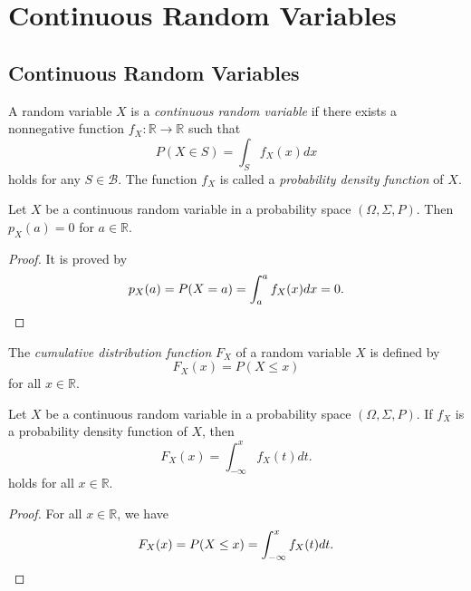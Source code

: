 \chapter{Continuous Random Variables}
\section{Continuous Random Variables}
\begin{definition}
  A random variable $X$ is a \emph{continuous random variable}
  if there exists a nonnegative function $f_X: \mathbb{R} \to \mathbb{R}$
  such that
  \begin{equation*}
    P(X \in S) = \int_S f_X(x) dx
  \end{equation*}
  holds for any $S \in \mathcal{B}$.
  The function $f_X$ is called a \emph{probability density function} of $X$.
\end{definition}

\begin{theorem}
  Let $X$ be a continuous random variable in a probability space
  $(\Omega, \Sigma, P)$.
  Then $p_X(a) = 0$ for $a \in \mathbb{R}$.
\end{theorem}
\begin{proof}
  It is proved by
  \begin{equation*}
    p_X(a) = P(X = a) = \int_a^a f_X(x)dx = 0. \qedhere
  \end{equation*}
\end{proof}

\begin{definition}
  The \emph{cumulative distribution function} $F_X$ of a random variable $X$
  is defined by
  \begin{equation*}
    F_X(x) = P(X \leq x)
  \end{equation*}
  for all $x \in \mathbb{R}$.
\end{definition}

\begin{theorem}
  Let $X$ be a continuous random variable in a probability space
  $(\Omega, \Sigma, P)$.
  If $f_X$ is a probability density function of $X$, then
  \begin{equation*}
    F_X(x) = \int_{-\infty}^x f_X(t) dt.
  \end{equation*}
  holds for all $x \in \mathbb{R}$.
\end{theorem}
\begin{proof}
  For all $x \in \mathbb{R}$, we have
  \begin{equation*}
    F_X(x) = P(X \leq x)
           = \int_{-\infty}^x f_X(t) dt. \qedhere
  \end{equation*}
\end{proof}

